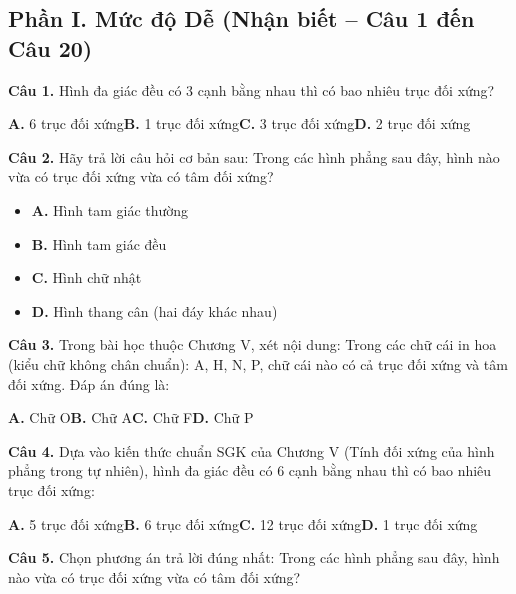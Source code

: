 \documentclass[11pt,a4paper]{article}
\begin{document}
\subsection*{\color{accent} Phần I. Mức độ Dễ (Nhận biết -- Câu 1 đến Câu 20)}
\textbf{\color{primary} Câu 1.} Hình đa giác đều có 3 cạnh bằng nhau thì có bao nhiêu trục đối xứng?\par
\hspace*{1.5em}\textbf{A.} 6 trục đối xứng\quad\quad \textbf{B.} 1 trục đối xứng\quad\quad \textbf{C.} 3 trục đối xứng\quad\quad \textbf{D.} 2 trục đối xứng\par\vspace{2pt}
\textbf{\color{primary} Câu 2.} Hãy trả lời câu hỏi cơ bản sau: Trong các hình phẳng sau đây, hình nào vừa có trục đối xứng vừa có tâm đối xứng?\par
\begin{itemize}\setlength{\itemsep}{1pt}\setlength{\parskip}{0pt}
  \item[] \textbf{A.} Hình tam giác thường
  \item[] \textbf{B.} Hình tam giác đều
  \item[] \textbf{C.} Hình chữ nhật
  \item[] \textbf{D.} Hình thang cân (hai đáy khác nhau)
\end{itemize}\vspace{2pt}
\textbf{\color{primary} Câu 3.} Trong bài học thuộc Chương V, xét nội dung: Trong các chữ cái in hoa (kiểu chữ không chân chuẩn): A, H, N, P, chữ cái nào có cả trục đối xứng và tâm đối xứng. Đáp án đúng là:\par
\hspace*{1.5em}\textbf{A.} Chữ O\quad\quad \textbf{B.} Chữ A\quad\quad \textbf{C.} Chữ F\quad\quad \textbf{D.} Chữ P\par\vspace{2pt}
\textbf{\color{primary} Câu 4.} Dựa vào kiến thức chuẩn SGK của Chương V (Tính đối xứng của hình phẳng trong tự nhiên), hình đa giác đều có 6 cạnh bằng nhau thì có bao nhiêu trục đối xứng:\par
\hspace*{1.5em}\textbf{A.} 5 trục đối xứng\quad\quad \textbf{B.} 6 trục đối xứng\quad\quad \textbf{C.} 12 trục đối xứng\quad\quad \textbf{D.} 1 trục đối xứng\par\vspace{2pt}
\textbf{\color{primary} Câu 5.} Chọn phương án trả lời đúng nhất: Trong các hình phẳng sau đây, hình nào vừa có trục đối xứng vừa có tâm đối xứng?\par
\end{document}
